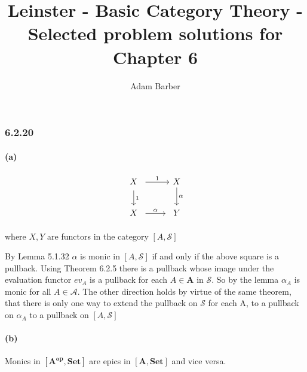 \documentclass{article}
\begin{document}
\title{Leinster - Basic Category Theory - Selected problem solutions for Chapter 6}
\author{Adam Barber}

\maketitle

\subsubsection*{6.2.20}

\paragraph{(a)}

\begin{equation}
  \label{eqn:5391}
  \begin{tikzcd}
    \begin{array}{c}
      X \\
    \end{array}
    \arrow[r, "1"] \arrow[d, "1"]
    & X \arrow[d, "\alpha"] \\
    \begin{array}{c}
      X
    \end{array}
    \arrow[r, "\alpha"]
    &
    \begin{array}{c}
     Y
    \end{array}
  \end{tikzcd}
\end{equation}

where $X, Y$ are functors in the category $\left[A,\mathcal{S}\right]$

By Lemma 5.1.32 $\alpha$ is monic in  $\left[A,\mathcal{S}\right]$ if and only if the above square is a pullback. Using Theorem 6.2.5 there is a pullback whose image under the evaluation functor $ev_A$ is a pullback for each $A \in \mathbf{A}$ in $\mathcal{S}$. So by the lemma $\alpha_A$ is monic for all $A \in \mathcal{A}$. The other direction holds by virtue of the same theorem, that there is only one way to extend the pullback on $\mathcal{S}$ for each A, to a pullback on $\alpha_A$ to a pullback on $\left[A,\mathcal{S}\right]$

\paragraph{(b)}

Monics in $\left[\mathbf{A^{op}},\mathbf{Set}\right]$ are epics in $\left[\mathbf{A},\mathbf{Set}\right]$ and vice versa.
\end{document}
